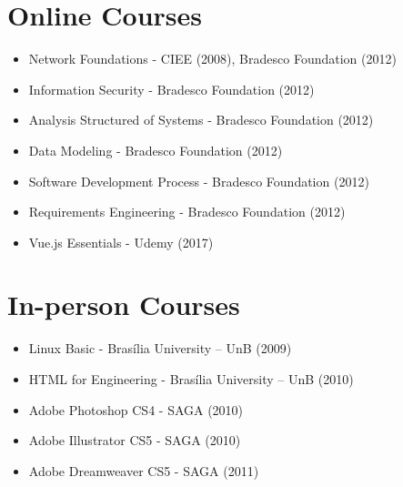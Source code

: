 \section{Online Courses}
\begin{itemize}
    \item Network Foundations - CIEE (2008), Bradesco Foundation (2012)
    \item Information Security - Bradesco Foundation (2012)
    \item Analysis Structured of Systems - Bradesco Foundation (2012)
    \item Data Modeling - Bradesco Foundation (2012)
    \item Software Development Process - Bradesco Foundation (2012)
    \item Requirements Engineering - Bradesco Foundation (2012)
    \item Vue.js Essentials - Udemy (2017)
\end{itemize}

\section{In-person Courses}
\begin{itemize}
    \item Linux Basic - Brasília University – UnB (2009)
    \item HTML for Engineering - Brasília University – UnB (2010)
    \item Adobe Photoshop CS4 - SAGA (2010)
    \item Adobe Illustrator CS5 - SAGA (2010)
    \item Adobe Dreamweaver CS5 - SAGA (2011)
\end{itemize}